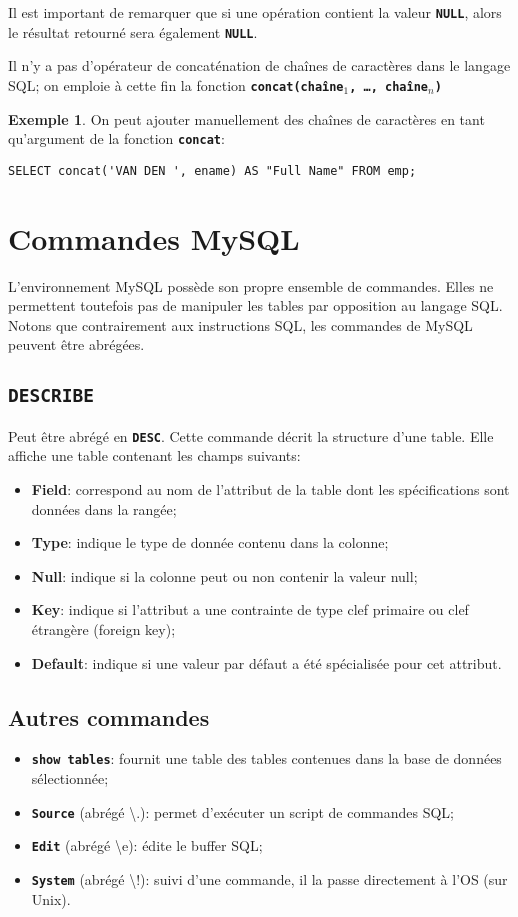 \documentclass[a4paper, 12pt]{report}
\newcommand{\textSQL}[1]{\texttt{\textbf{#1}}}
\theoremstyle{definition} \newtheorem{ex}{Exemple}
\begin{document}
Il est important de remarquer que si une opération contient la valeur \textSQL{NULL}, alors le résultat retourné sera également \textSQL{NULL}.

Il n'y a pas d'opérateur de concaténation de chaînes de caractères dans le langage SQL; on emploie à cette fin la fonction \textSQL{concat(chaîne$_1$, \ldots, chaîne$_n$)}

\begin{ex}On peut ajouter manuellement des chaînes de caractères en tant qu'argument de la fonction \textSQL{concat}:
\begin{lstlisting}[frame=single]
SELECT concat('VAN DEN ', ename) AS "Full Name" FROM emp;
\end{lstlisting}
\end{ex}

\section{Commandes MySQL}
L'environnement MySQL possède son propre ensemble de commandes. Elles ne permettent toutefois pas de manipuler les tables par opposition au langage SQL. Notons que contrairement aux instructions SQL, les commandes de MySQL peuvent être abrégées.
\subsection{\textSQL{DESCRIBE}}
Peut être abrégé en \textSQL{DESC}. Cette commande décrit la structure d'une table. Elle affiche une table contenant les champs suivants:
	\begin{itemize}
		\item \textbf{Field}: correspond au nom de l'attribut de la table dont les spécifications sont données dans la rangée;
		\item \textbf{Type}: indique le type de donnée contenu dans la colonne;
		\item \textbf{Null}: indique si la colonne peut ou non contenir la valeur null;
		\item \textbf{Key}: indique si l'attribut a une contrainte de type clef primaire ou clef étrangère (foreign key);
		\item \textbf{Default}: indique si une valeur par défaut a été spécialisée pour cet attribut.
	\end{itemize}
\subsection{Autres commandes}
\begin{itemize}
		\item \textSQL{show tables}: fournit une table des tables contenues dans la base de données sélectionnée;
		\item \textSQL{Source} (abrégé \textbackslash{}.): permet d'exécuter un script de commandes SQL;
		\item \textSQL{Edit} (abrégé \textbackslash{}e): édite le buffer SQL;
		\item \textSQL{System} (abrégé \textbackslash{}!): suivi d'une commande, il la passe directement à l'OS (sur Unix).
	\end{itemize}
	
\end{document}
